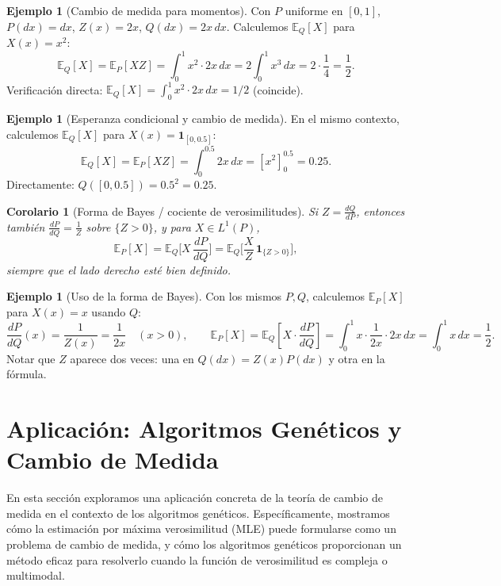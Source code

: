 \documentclass[11pt,a4paper]{article}
\theoremstyle{plain}
\newtheorem{corollary}[theorem]{Corolario}
\theoremstyle{definition}
\newtheorem{example}[theorem]{Ejemplo}
\theoremstyle{remark}
\newcommand{\1}{\mathbf{1}}
\newcommand{\EE}{\mathbb{E}}
\begin{document}
\begin{example}[Cambio de medida para momentos]
Con $P$ uniforme en $[0,1]$, $P(dx)=dx$, $Z(x)=2x$, $Q(dx)=2x\,dx$. Calculemos $\EE_Q[X]$ para $X(x)=x^2$:
\[
\EE_Q[X] = \EE_P[XZ] = \int_0^1 x^2\cdot 2x\,dx = 2\int_0^1 x^3\,dx = 2\cdot\frac{1}{4} = \frac{1}{2}.
\]
Verificación directa: $\EE_Q[X] = \int_0^1 x^2\cdot 2x\,dx = 1/2$ (coincide).
\end{example}

\begin{example}[Esperanza condicional y cambio de medida]
En el mismo contexto, calculemos $\EE_Q[X]$ para $X(x)=\1_{[0,0.5]}$:
\[
\EE_Q[X] = \EE_P[XZ] = \int_0^{0.5} 2x\,dx = [x^2]_0^{0.5} = 0.25.
\]
Directamente: $Q([0,0.5]) = 0.5^2 = 0.25$.
\end{example}

\begin{corollary}[Forma de Bayes / cociente de verosimilitudes]
Si $Z=\frac{dQ}{dP}$, entonces también $\frac{dP}{dQ}=\frac{1}{Z}$ sobre $\{Z>0\}$, y para $X\in L^1(P)$,
\[
\EE_P[X]=\EE_Q\!\Big[X\,\frac{dP}{dQ}\Big]
=\EE_Q\!\Big[\frac{X}{Z}\,\1_{\{Z>0\}}\Big],
\]
siempre que el lado derecho esté bien definido.
\end{corollary}

\begin{example}[Uso de la forma de Bayes]
Con los mismos $P,Q$, calculemos $\EE_P[X]$ para $X(x)=x$ usando $Q$:
\[
\frac{dP}{dQ}(x) = \frac{1}{Z(x)} = \frac{1}{2x}\quad (x>0),\qquad
\EE_P[X] = \EE_Q\left[X\cdot\frac{dP}{dQ}\right] = \int_0^1 x\cdot\frac{1}{2x}\cdot 2x\,dx = \int_0^1 x\,dx = \frac{1}{2}.
\]
Notar que $Z$ aparece dos veces: una en $Q(dx)=Z(x)P(dx)$ y otra en la fórmula.
\end{example}

\section{Aplicación: Algoritmos Genéticos y Cambio de Medida}
\label{sec:ag}

En esta sección exploramos una aplicación concreta de la teoría de cambio de medida en el contexto de los algoritmos genéticos. Específicamente, mostramos cómo la estimación por máxima verosimilitud (MLE) puede formularse como un problema de cambio de medida, y cómo los algoritmos genéticos proporcionan un método eficaz para resolverlo cuando la función de verosimilitud es compleja o multimodal.
\end{document}
